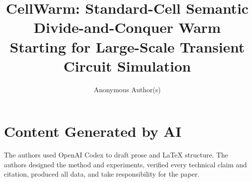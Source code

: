 \documentclass[sigconf,anonymous]{acmart}
\title{CellWarm: Standard-Cell Semantic Divide-and-Conquer Warm Starting for Large-Scale Transient Circuit Simulation}
\author{Anonymous Author(s)}
\affiliation{\institution{Anonymous Institution}}
\begin{document}
\begin{abstract}

\end{abstract}


\maketitle









\section*{Content Generated by AI}
The authors used OpenAI Codex to draft prose and LaTeX structure. The authors designed the method and experiments, verified every technical claim and citation, produced all data, and take responsibility for the paper.

\balance


\end{document}
